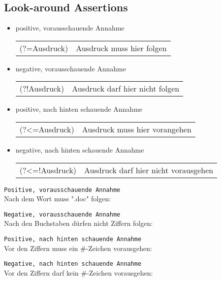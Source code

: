 \subsection{Look-around Assertions}
\begin{itemize}
	\item positive, vorausschauende Annahme\\
	\begin{tabular}{ll}
		(?=Ausdruck)& Ausdruck muss hier folgen\\
	\end{tabular}
	\item negative, vorausschauende Annahme\\
	\begin{tabular}{ll}
		(?!Ausdruck)& Ausdruck darf hier nicht folgen\\
	\end{tabular}
	\item positive, nach hinten schauende Annahme\\
	\begin{tabular}{ll}
		(?<=Ausdruck)& Ausdruck muss hier vorangehen\\
	\end{tabular}
	\item negative, nach hinten schauende Annahme\\
	\begin{tabular}{ll}
		(?<=!Ausdruck)& Ausdruck darf hier nicht vorausgehen\\
	\end{tabular}
\end{itemize}
\texttt{Positive, vorausschauende Annahme}\\
Nach dem Wort muss ".doc" folgen:

\texttt{Negative, vorausschauende Annahme}\\
Nach den Buchstaben dürfen nicht Ziffern folgen:

\texttt{Positive, nach hinten schauende Annahme}\\
Vor den Ziffern muss ein \#-Zeichen vorausgehen:

\texttt{Negative, nach hinten schauende Annahme}\\
Vor den Ziffern darf kein \#-Zeichen vorausgehen:
